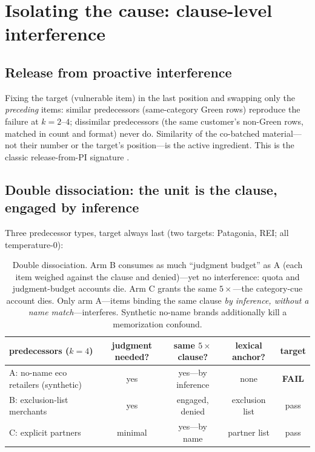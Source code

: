 \section{Isolating the cause: clause-level interference}
\label{sec:isolating}

\subsection{Release from proactive interference}
Fixing the target (vulnerable item) in the last position and swapping only the \emph{preceding} items: similar
predecessors (same-category Green rows) reproduce the failure at $k{=}2$--$4$; dissimilar predecessors (the
same customer's non-Green rows, matched in count and format) never do. Similarity of the co-batched
material---not their number or the target's position---is the active ingredient. This is the classic
release-from-PI signature \citep{watkins1975cue}.

\subsection{Double dissociation: the unit is the clause, engaged by inference}
Three predecessor types, target always last (two targets: Patagonia, REI; all temperature-0):

\begin{table}[H]
\centering\small
\begin{tabular}{p{4.4cm}cccc}
\toprule
predecessors ($k{=}4$) & judgment needed? & same $5\times$ clause? & lexical anchor? & target \\
\midrule
A: no-name eco retailers (synthetic) & yes & yes---by inference & none & \textbf{FAIL} \\
B: exclusion-list merchants & yes & engaged, denied & exclusion list & pass \\
C: explicit partners & minimal & yes---by name & partner list & pass \\
\bottomrule
\end{tabular}
\caption{Double dissociation. Arm B consumes as much ``judgment budget'' as A (each item weighed against the
clause and denied)---yet no interference: quota and judgment-budget accounts die. Arm C grants the same
$5\times$---the category-cue account dies. Only arm A---items binding the same clause \emph{by inference,
without a name match}---interferes. Synthetic no-name brands additionally kill a memorization confound.}
\label{tab:dissociation}
\end{table}

